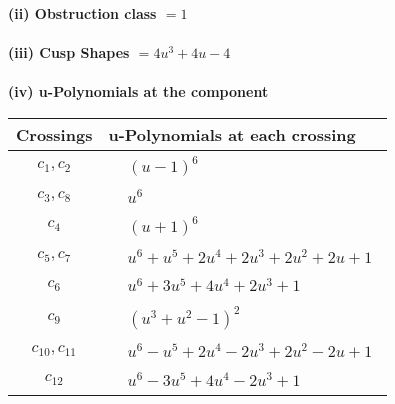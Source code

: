 \documentclass[1p]{elsarticle_modified}
\theoremstyle{definition}
\begin{document}
\flushleft \textbf{(ii) Obstruction class $= 1$}\\~\\
\flushleft \textbf{(iii) Cusp Shapes $= 4 u^3+4 u-4$}\\~\\
\newpage\renewcommand{\arraystretch}{1}
\flushleft \textbf{(iv) u-Polynomials at the component}\newline \\
\begin{tabular}{m{50pt}|m{274pt}}
Crossings & \hspace{64pt}u-Polynomials at each crossing \\
\hline $$\begin{aligned}c_{1},c_{2}\end{aligned}$$&$\begin{aligned}
&(u-1)^6
\end{aligned}$\\
\hline $$\begin{aligned}c_{3},c_{8}\end{aligned}$$&$\begin{aligned}
&u^6
\end{aligned}$\\
\hline $$\begin{aligned}c_{4}\end{aligned}$$&$\begin{aligned}
&(u+1)^6
\end{aligned}$\\
\hline $$\begin{aligned}c_{5},c_{7}\end{aligned}$$&$\begin{aligned}
&u^6+u^5+2 u^4+2 u^3+2 u^2+2 u+1
\end{aligned}$\\
\hline $$\begin{aligned}c_{6}\end{aligned}$$&$\begin{aligned}
&u^6+3 u^5+4 u^4+2 u^3+1
\end{aligned}$\\
\hline $$\begin{aligned}c_{9}\end{aligned}$$&$\begin{aligned}
&(u^3+u^2-1)^2
\end{aligned}$\\
\hline $$\begin{aligned}c_{10},c_{11}\end{aligned}$$&$\begin{aligned}
&u^6- u^5+2 u^4-2 u^3+2 u^2-2 u+1
\end{aligned}$\\
\hline $$\begin{aligned}c_{12}\end{aligned}$$&$\begin{aligned}
&u^6-3 u^5+4 u^4-2 u^3+1
\end{aligned}$\\
\hline
\end{tabular}\\~\\
\end{document}
